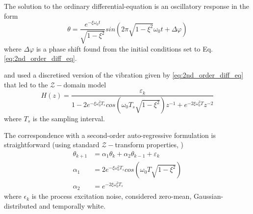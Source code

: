\documentclass[a4paper,12pt]{article}
\newcommand{\0}{\mathsf{0}} %
\begin{document}
The solution to the ordinary differential-equation is an oscillatory response in the form
\begin{equation}
  \theta = \frac{e^{-\xi\omega_0 t}}{\sqrt{1-\xi^2}}sin\left(2\pi\sqrt{1-\xi^2}\omega_0 t + \Delta \varphi\right) 
\end{equation}
where $\Delta \varphi$ is a phase shift found from the initial
conditions set to Eq. \eqref{eq:2nd_order_diff_eq}.

\cite{petit08} and \cite{meimon10} used a discretised version of the
vibration given by \eqref{eq:2nd_order_diff_eq} that led to the $\mathcal Z-$domain model
\begin{equation}\label{eq:TF_disc_vib}
  H(z) = \frac{\varepsilon_k}{1-2e^{-\xi \omega_0^2T_s} cos\left(\omega_0 T_s \sqrt{1-\xi^2}\right)z^{-1} +e^{-2\xi \omega_0^2T}z^{-2} }
\end{equation}
where $T_s$ is the sampling interval. 

The correspondence with a second-order auto-regressive formulation is
straightforward (using standard $\mathcal Z-$transform properties, \cite{oppenheim97})
\begin{subequations}
 \begin{align}\label{eq:ar2_vibration}
 \theta_{k+1} & = \alpha_1  \theta_{k} + \alpha_2  \theta_{k-1} + \varepsilon_k \\
\alpha_1 & = 2e^{-\xi \omega_0^2T_s} cos\left(\omega_0 T \sqrt{1-\xi^2}\right) \\
\alpha_2 & = e^{-2\xi \omega_0^2T_s}
\end{align}
\end{subequations}
where $\epsilon_k$ is the process excitation noise, considered zero-mean,
Gaussian-distributed and temporally white.
\end{document}
